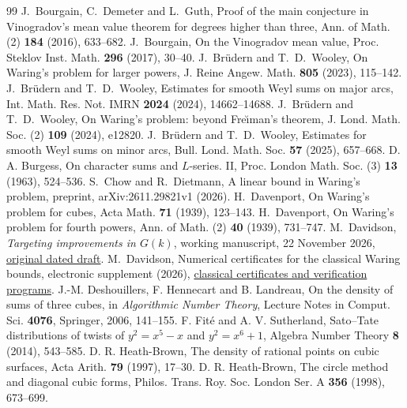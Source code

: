\documentclass[11pt,letterpaper]{article}
\theoremstyle{definition}
\begin{document}
\begin{thebibliography}{99}
 J.~Bourgain, C.~Demeter and L.~Guth, Proof of the main conjecture in Vinogradov's mean value theorem for degrees higher than three, Ann. of Math. (2) \textbf{184} (2016), 633--682.
 J.~Bourgain, On the Vinogradov mean value, Proc. Steklov Inst. Math. \textbf{296} (2017), 30--40.
 J.~Br\"udern and T.~D.~Wooley, On Waring's problem for larger powers, J. Reine Angew. Math. \textbf{805} (2023), 115--142.
 J.~Br\"udern and T.~D.~Wooley, Estimates for smooth Weyl sums on major arcs, Int. Math. Res. Not. IMRN \textbf{2024} (2024), 14662--14688.
 J.~Br\"udern and T.~D.~Wooley, On Waring's problem: beyond Fre{\u\i}man's theorem, J. Lond. Math. Soc. (2) \textbf{109} (2024), e12820.
 J.~Br\"udern and T.~D.~Wooley, Estimates for smooth Weyl sums on minor arcs, Bull. Lond. Math. Soc. \textbf{57} (2025), 657--668.
 D. A. Burgess, On character sums and $L$-series. II, Proc. London Math. Soc. (3) \textbf{13} (1963), 524--536.
 S.~Chow and R.~Dietmann, A linear bound in Waring's problem, preprint, arXiv:2611.29821v1 (2026).
 H.~Davenport, On Waring's problem for cubes, Acta Math. \textbf{71} (1939), 123--143.
 H.~Davenport, On Waring's problem for fourth powers, Ann. of Math. (2) \textbf{40} (1939), 731--747.
 M.~Davidson, \emph{Targeting improvements in $G(k)$},
working manuscript, 22 November 2026, \href{https://github.com/morley988/warings-problem/blob/main/historical-drafts/2026-11-22/Gk_Target_Selection_Working_Manuscript.pdf}{original dated draft}.
 M.~Davidson, Numerical certificates for the classical Waring bounds, electronic supplement (2026), \href{https://github.com/morley988/warings-problem/tree/3752a566d4ae778c3f2effaeb7caec4fc8899514/supplements/classical}{classical certificates and verification programs}.
 J.-M. Deshouillers, F. Hennecart and B. Landreau, On the density of sums of three cubes, in \emph{Algorithmic Number Theory}, Lecture Notes in Comput. Sci. \textbf{4076}, Springer, 2006, 141--155.
 F. Fit\'e and A. V. Sutherland, Sato--Tate distributions of twists of $y^2=x^5-x$ and $y^2=x^6+1$, Algebra Number Theory \textbf{8} (2014), 543--585.
 D. R. Heath-Brown, The density of rational points on cubic surfaces, Acta Arith. \textbf{79} (1997), 17--30.
 D. R. Heath-Brown, The circle method and diagonal cubic forms, Philos. Trans. Roy. Soc. London Ser. A \textbf{356} (1998), 673--699.

\end{thebibliography}
\end{document}
